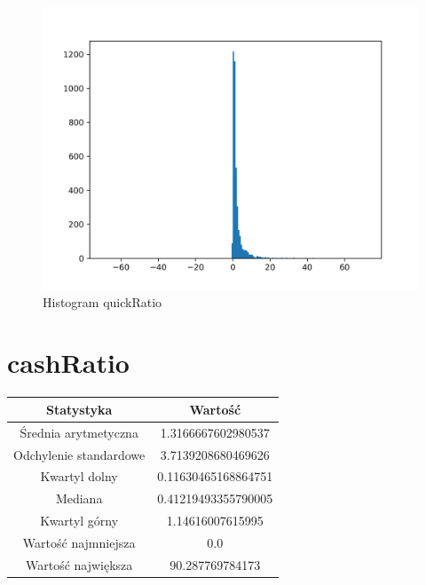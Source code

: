 \documentclass{article}
\begin{document}
\begin{figure}[h!]
    \includegraphics[width=\linewidth]{variables/quickRatio.png}
    \caption{Histogram quickRatio }
\end{figure}\section{ cashRatio }

\begin{center}
    \begin{tabular}{|c | c|} 
    \hline
    Statystyka & Wartość \\
    \hline\hline
    Średnia arytmetyczna & 1.3166667602980537 \\ 
    \hline
    Odchylenie standardowe & 3.7139208680469626 \\
    \hline
    Kwartyl dolny & 0.11630465168864751 \\
    \hline
    Mediana & 0.41219493355790005 \\
    \hline
    Kwartyl górny & 1.14616007615995 \\
    \hline
    Wartość najmniejsza & 0.0 \\
    \hline
    Wartość największa & 90.287769784173 \\
    \hline
   \end{tabular}
\end{center}
\end{document}
